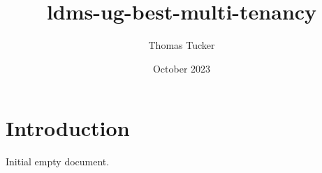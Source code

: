 \documentclass{article}
\title{ldms-ug-best-multi-tenancy}
\author{Thomas Tucker}
\date{October 2023}
\begin{document}
\section{Introduction}
Initial empty document.
\end{document}
